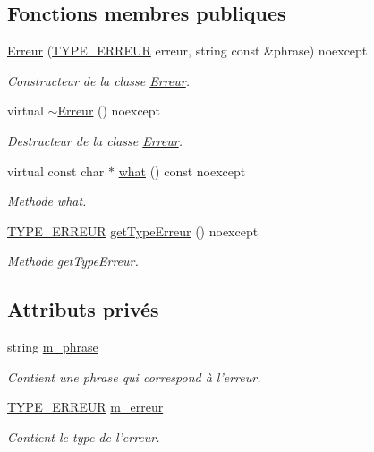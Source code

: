 \subsection*{Fonctions membres publiques}
\begin{DoxyCompactItemize}
\item 
\hyperlink{class_c_i2_c_1_1_erreur_a2db008616ca661df8df52d35e3fa26f9}{Erreur} (\hyperlink{class_c_i2_c_1_1_erreur_a153281c8e751b72b355d52c548b511d5}{T\+Y\+P\+E\+\_\+\+E\+R\+R\+E\+U\+R} erreur, string const \&phrase) noexcept
\begin{DoxyCompactList}\small\item\em Constructeur de la classe \hyperlink{class_c_i2_c_1_1_erreur}{Erreur}. \end{DoxyCompactList}\item 
virtual \hyperlink{class_c_i2_c_1_1_erreur_a8ed19157b6dd1cfe68dba1d4d6fab2d2}{$\sim$\+Erreur} () noexcept
\begin{DoxyCompactList}\small\item\em Destructeur de la classe \hyperlink{class_c_i2_c_1_1_erreur}{Erreur}. \end{DoxyCompactList}\item 
virtual const char $\ast$ \hyperlink{class_c_i2_c_1_1_erreur_af38041f60a330ca1603d462c01b118f3}{what} () const noexcept
\begin{DoxyCompactList}\small\item\em Methode what. \end{DoxyCompactList}\item 
\hyperlink{class_c_i2_c_1_1_erreur_a153281c8e751b72b355d52c548b511d5}{T\+Y\+P\+E\+\_\+\+E\+R\+R\+E\+U\+R} \hyperlink{class_c_i2_c_1_1_erreur_a1f9da2c2241b49e5be93bf99438190a1}{get\+Type\+Erreur} () noexcept
\begin{DoxyCompactList}\small\item\em Methode get\+Type\+Erreur. \end{DoxyCompactList}\end{DoxyCompactItemize}
\subsection*{Attributs privés}
\begin{DoxyCompactItemize}
\item 
string \hyperlink{class_c_i2_c_1_1_erreur_ac61872a33babfea899fa3f3feaedaf32}{m\+\_\+phrase}
\begin{DoxyCompactList}\small\item\em Contient une phrase qui correspond à l'erreur. \end{DoxyCompactList}\item 
\hyperlink{class_c_i2_c_1_1_erreur_a153281c8e751b72b355d52c548b511d5}{T\+Y\+P\+E\+\_\+\+E\+R\+R\+E\+U\+R} \hyperlink{class_c_i2_c_1_1_erreur_a0228754dfbaabca99985b8701fcd92b0}{m\+\_\+erreur}
\begin{DoxyCompactList}\small\item\em Contient le type de l'erreur. \end{DoxyCompactList}\end{DoxyCompactItemize}


